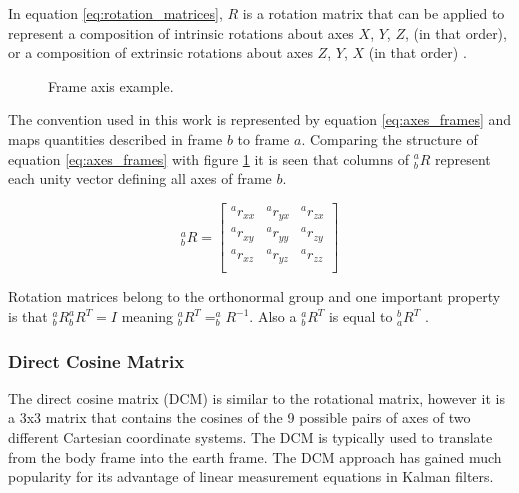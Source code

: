 In equation \ref{eq:rotation_matrices}, $R$ is a rotation matrix that can be applied to represent a composition of intrinsic rotations about axes $X$, $Y$, $Z$, (in that order), or a composition of extrinsic rotations about axes $Z$, $Y$, $X$ (in that order) \cite{weisstein2003rotation}.

\begin{figure}[!h]
    \centering
    \resizebox{0.44\linewidth}{!}{}
    \resizebox{0.54\linewidth}{!}{}
    \caption{Frame axis example.}
    \label{fig:axes_frames}
\end{figure}

The convention used in this work is represented by equation \ref{eq:axes_frames} and maps quantities described in frame $b$ to frame $a$. Comparing the structure of equation \ref{eq:axes_frames} with figure \ref{fig:axes_frames} it is seen that columns of $^a_bR$ represent each unity vector defining all axes of frame $b$.

\begin{equation}
    \textrm{$_{b}^{a}R$}
    =
    \begin{bmatrix}
        \textrm{$^{a}r_{xx}$} & \textrm{$^{a}r_{yx}$} & \textrm{$^{a}r_{zx}$} \\
        \textrm{$^{a}r_{xy}$} & \textrm{$^{a}r_{yy}$} & \textrm{$^{a}r_{zy}$} \\
        \textrm{$^{a}r_{xz}$} & \textrm{$^{a}r_{yz}$} & \textrm{$^{a}r_{zz}$} \\
    \end{bmatrix}
    \label{eq:axes_frames}
\end{equation}

Rotation matrices belong to the orthonormal group and one important property is that $^a_bR ^a_bR^T = I$ meaning $^a_bR^T = ^a_bR^{-1}$. Also a $^a_bR^T$ is equal to $^b_aR^T$ \cite{gruber2000mathematics}.

\subsubsection{Direct Cosine Matrix}

The direct cosine matrix (DCM) is similar to the rotational matrix, however it is a 3x3
matrix that contains the cosines of the 9 possible pairs of axes of two different Cartesian coordinate systems. The DCM is typically used to translate from the body frame into the earth frame. The DCM approach has gained much popularity for its advantage of
linear measurement equations in Kalman filters. \cite{premerlani2009direction}


